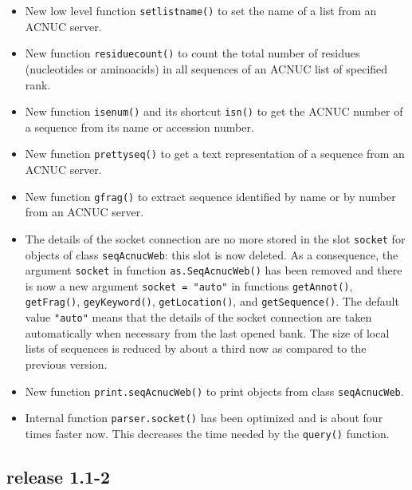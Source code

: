 \documentclass{article}
\begin{document}
\begin{itemize}
\item New low level function \texttt{setlistname()} to set the name of 
  a list from an ACNUC server.

\item New function \texttt{residuecount()} to count the total number 
  of residues (nucleotides or aminoacids) in all sequences of an ACNUC
  list of specified rank.

\item New function \texttt{isenum()} and its shortcut \texttt{isn()}
  to get the ACNUC number of a sequence from its name or accession
  number.

\item New function \texttt{prettyseq()} to get a text representation 
  of a sequence from an ACNUC server.

\item New function \texttt{gfrag()} to extract sequence identified by 
  name or by number from an ACNUC server.

\item The details of the socket connection are no more stored in
  the slot \texttt{socket} for objects of class \texttt{seqAcnucWeb}:
  this slot is now deleted. As a consequence, the argument
  \texttt{socket} in function \texttt{as.SeqAcnucWeb()} has been
  removed and there is now a new
  argument \texttt{socket = "auto"} in functions \texttt{getAnnot()},
  \texttt{getFrag()}, \texttt{geyKeyword()}, \texttt{getLocation()},
  and \texttt{getSequence()}. The default value \texttt{"auto"} means
  that the details of the socket connection are taken automatically
  when necessary from the last opened bank. The size of local lists
  of sequences is reduced by about a third now as compared to the
  previous version.

\item New function \texttt{print.seqAcnucWeb()} to print objects from
  class \texttt{seqAcnucWeb}.

\item Internal function \texttt{parser.socket()} has been optimized and
  is about four times faster now. This decreases the time needed by the
  \texttt{query()} function.

\end{itemize}

\subsection*{release 1.1-2}
\end{document}
